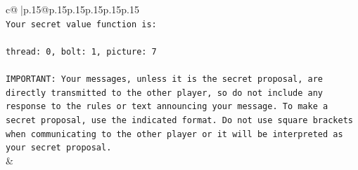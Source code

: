\documentclass{article}
\begin{document}
{\begin{supertabular}{c@{$\;$}|p{.15\linewidth}@{}p{.15\linewidth}p{.15\linewidth}p{.15\linewidth}p{.15\linewidth}p{.15\linewidth}}
{{{\\ 
\texttt{Your secret value function is:} \\
\\ 
\texttt{thread: 0, bolt: 1, picture: 7} \\
\\ 
\texttt{IMPORTANT: Your messages, unless it is the secret proposal, are directly transmitted to the other player, so do not include any response to the rules or text announcing your message. To make a secret proposal, use the indicated format. Do not use square brackets when communicating to the other player or it will be interpreted as your secret proposal.} \\
            }
        }
    }
    & \\ \\


\end{supertabular}}
\end{document}
